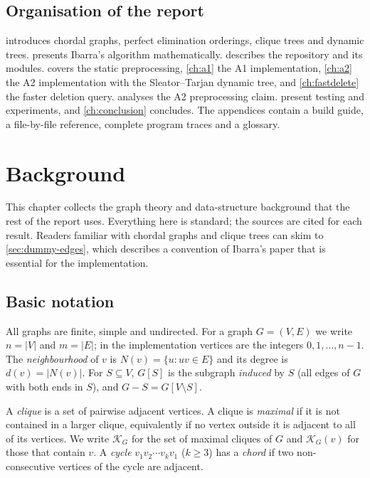 \documentclass[11pt,a4paper,oneside]{report}
\theoremstyle{plain}
\theoremstyle{definition}
\theoremstyle{remark}
\newcommand{\KG}{\mathcal{K}_G}
\begin{document}
\section{Organisation of the report}
 introduces chordal graphs, perfect elimination orderings, clique trees
and dynamic trees.  presents Ibarra's algorithm mathematically.
 describes the repository and its modules.  covers the
static preprocessing, \cref{ch:a1} the A1 implementation, \cref{ch:a2} the A2 implementation
with the Sleator--Tarjan dynamic tree, and \cref{ch:fastdelete} the faster deletion query.  analyses the A2
preprocessing claim.  present testing and experiments, and
\cref{ch:conclusion} concludes. The appendices contain a build guide, a file-by-file reference,
complete program traces and a glossary.
\chapter{Background}\label{ch:background}
This chapter collects the graph theory and data-structure background that the rest of the
report uses. Everything here is standard; the sources are cited for each result. Readers
familiar with chordal graphs and clique trees can skim to \cref{sec:dummy-edges}, which
describes a convention of Ibarra's paper that is essential for the implementation.

\section{Basic notation}
All graphs are finite, simple and undirected. For a graph \(G=(V,E)\) we write \(n=|V|\) and
\(m=|E|\); in the implementation vertices are the integers \(0,1,\dots,n-1\). The
\emph{neighbourhood} of \(v\) is \(N(v)=\{u : uv\in E\}\) and its degree is \(d(v)=|N(v)|\).
For \(S\subseteq V\), \(G[S]\) is the subgraph \emph{induced} by \(S\) (all edges of \(G\) with
both ends in \(S\)), and \(G-S=G[V\setminus S]\).

A \emph{clique} is a set of pairwise adjacent vertices. A clique is \emph{maximal} if it is not
contained in a larger clique, equivalently if no vertex outside it is adjacent to all of its
vertices. We write \(\KG\) for the set of maximal cliques of \(G\) and \(\KG(v)\) for those that
contain \(v\). A \emph{cycle} \(v_1v_2\cdots v_kv_1\) (\(k\ge 3\)) has a \emph{chord} if two
non-consecutive vertices of the cycle are adjacent.
\end{document}
